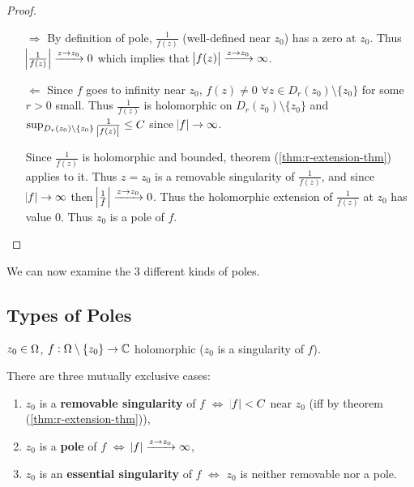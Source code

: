 \begin{proof}
\begin{enumerate}
    \item[$\Rightarrow$] By definition of pole, $\frac{1}{f(z)}$ (well-defined near $z_0$) has a zero at $z_0$. Thus $\abs{\frac{1}{f(z)}} \xrightarrow[]{z\to z_0}0$ which implies that $\abs{f(z)} \xrightarrow[]{z\to z_0} \infty$.
    
    \item[$\Leftarrow$] Since $f$ goes to infinity near $z_0$, $f(z) \neq 0$ $ \forall z \in D_r(z_0) \setminus \{ z_0 \}$ for some $r>0$ small. Thus $\frac{1}{f(z)}$ is holomorphic on $D_r(z_0) \setminus \{ z_0 \}$ and $\sup_{D_r(z_0) \setminus \{ z_0 \}} \frac{1}{\abs{f(z)}} \leq C$ since $\abs{f} \to \infty$.
    
    Since $\frac{1}{f(z)}$ is holomorphic and bounded, theorem (\ref{thm:r-extension-thm}) applies to it. Thus $z=z_0$ is a removable singularity of $\frac{1}{f(z)}$, and since $\abs{f} \to \infty$ then $\abs{\frac{1}{f}} \xrightarrow[]{z\to z_0} 0$. Thus the holomorphic extension of $\frac{1}{f(z)}$ at $z_0$ has value 0. Thus $z_0$ is a pole of $f$.
\end{enumerate}
\end{proof}

We can now examine the 3 different kinds of poles.

\subsection{Types of Poles}

\begin{definition}
$z_0 \in \Omega$, $f: \Omega \setminus \{ z_0 \} \to \mathbb{C}$ holomorphic ($z_0$ is a singularity of $f$).

There are three mutually exclusive cases:
\begin{enumerate}
    \item $z_0$ is a \textbf{removable singularity} of $f$ $\iff$ $\abs{f} < C$ near $z_0$ (iff by theorem (\ref{thm:r-extension-thm})),
    
    \item $z_0$ is a \textbf{pole} of $f$ $\iff$ $\abs{f} \xrightarrow[]{z\to z_0} \infty$,
    
    \item $z_0$ is an \textbf{essential singularity} of $f$ $\iff$ $z_0$ is neither removable nor a pole.
\end{enumerate}
\end{definition}

